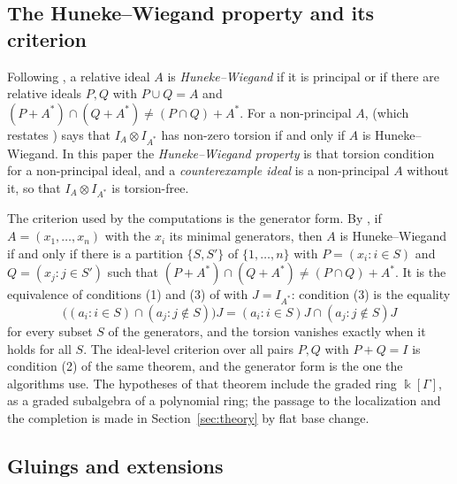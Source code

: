 \documentclass[11pt]{article}
\theoremstyle{definition}
\theoremstyle{remark}
\newcommand{\kk}{\Bbbk}
\begin{document}
\subsection{The Huneke--Wiegand property and its criterion}

Following \cite[Section~1]{GarciaSanchezLeamer2013}, a relative ideal $A$ is \emph{Huneke--Wiegand} if it is
principal or if there are relative ideals $P,Q$ with $P\cup Q=A$ and $(P+A^*)\cap(Q+A^*)\ne(P\cap Q)+A^*$. For a
non-principal $A$, \cite[Theorem~6]{GarciaSanchezLeamer2013} (which restates \cite[Theorem~1.4]{Leamer2012})
says that $I_A\otimes I_{A^*}$ has non-zero torsion if and only if $A$ is Huneke--Wiegand. In this paper the
\emph{Huneke--Wiegand property} is that torsion condition for a non-principal ideal, and a \emph{counterexample
ideal} is a non-principal $A$ without it, so that $I_A\otimes I_{A^*}$ is torsion-free.

The criterion used by the computations is the generator form. By \cite[Remark~3]{GarciaSanchezLeamer2013}, if
$A=(x_1,\dots,x_n)$ with the $x_i$ its minimal generators, then $A$ is Huneke--Wiegand if and only if there is a
partition $\{S,S'\}$ of $\{1,\dots,n\}$ with $P=(x_i:i\in S)$ and $Q=(x_j:j\in S')$ such that
$(P+A^*)\cap(Q+A^*)\ne(P\cap Q)+A^*$. It is the equivalence of conditions (1) and (3) of
\cite[Theorem~1.4]{Leamer2012} with $J=I_{A^*}$: condition (3) is the equality
\begin{equation}\label{eq:partition}
\bigl((a_i:i\in S)\cap(a_j:j\notin S)\bigr)J=(a_i:i\in S)J\cap(a_j:j\notin S)J
\end{equation}
for every subset $S$ of the generators, and the torsion vanishes exactly when it holds for all $S$.
The ideal-level criterion over all pairs $P,Q$ with $P+Q=I$ is condition (2) of the same theorem, and the
generator form is the one the algorithms use. The hypotheses of that theorem include the graded ring $\kk[\Gamma]$, as a graded subalgebra of a polynomial ring; the
passage to the localization and the completion is made in Section~\ref{sec:theory} by flat base change.

\subsection{Gluings and extensions}
\end{document}
